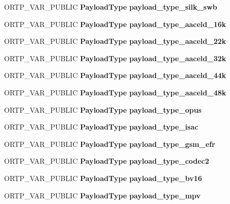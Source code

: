 \begin{DoxyCompactItemize}
O\+R\+T\+P\+\_\+\+V\+A\+R\+\_\+\+P\+U\+B\+L\+IC \textbf{ Payload\+Type} {\bfseries payload\+\_\+type\+\_\+silk\+\_\+swb}
\item 
\mbox{\label{payloadtype_8h_ac62ee0e65d25838cfeba9486b8907f7b}} 
O\+R\+T\+P\+\_\+\+V\+A\+R\+\_\+\+P\+U\+B\+L\+IC \textbf{ Payload\+Type} {\bfseries payload\+\_\+type\+\_\+aaceld\+\_\+16k}
\item 
\mbox{\label{payloadtype_8h_a86e4368c944cc1e7ff6abc2d0a742883}} 
O\+R\+T\+P\+\_\+\+V\+A\+R\+\_\+\+P\+U\+B\+L\+IC \textbf{ Payload\+Type} {\bfseries payload\+\_\+type\+\_\+aaceld\+\_\+22k}
\item 
\mbox{\label{payloadtype_8h_a3cdec7e99781dab60a2ab58a81e49925}} 
O\+R\+T\+P\+\_\+\+V\+A\+R\+\_\+\+P\+U\+B\+L\+IC \textbf{ Payload\+Type} {\bfseries payload\+\_\+type\+\_\+aaceld\+\_\+32k}
\item 
\mbox{\label{payloadtype_8h_af85fa455e0537670bf67feba5acfa2cb}} 
O\+R\+T\+P\+\_\+\+V\+A\+R\+\_\+\+P\+U\+B\+L\+IC \textbf{ Payload\+Type} {\bfseries payload\+\_\+type\+\_\+aaceld\+\_\+44k}
\item 
\mbox{\label{payloadtype_8h_a0b9a16464f1bd282c1ac50fd48a981bb}} 
O\+R\+T\+P\+\_\+\+V\+A\+R\+\_\+\+P\+U\+B\+L\+IC \textbf{ Payload\+Type} {\bfseries payload\+\_\+type\+\_\+aaceld\+\_\+48k}
\item 
\mbox{\label{payloadtype_8h_acedd965051514faf20d18bcac6273fa9}} 
O\+R\+T\+P\+\_\+\+V\+A\+R\+\_\+\+P\+U\+B\+L\+IC \textbf{ Payload\+Type} {\bfseries payload\+\_\+type\+\_\+opus}
\item 
\mbox{\label{payloadtype_8h_adc055078d81b67978fe095728c0d5eb6}} 
O\+R\+T\+P\+\_\+\+V\+A\+R\+\_\+\+P\+U\+B\+L\+IC \textbf{ Payload\+Type} {\bfseries payload\+\_\+type\+\_\+isac}
\item 
\mbox{\label{payloadtype_8h_a45271e49a019ada1de37e0219b1925c1}} 
O\+R\+T\+P\+\_\+\+V\+A\+R\+\_\+\+P\+U\+B\+L\+IC \textbf{ Payload\+Type} {\bfseries payload\+\_\+type\+\_\+gsm\+\_\+efr}
\item 
\mbox{\label{payloadtype_8h_a7deefb872468aac3860fa88377ac0798}} 
O\+R\+T\+P\+\_\+\+V\+A\+R\+\_\+\+P\+U\+B\+L\+IC \textbf{ Payload\+Type} {\bfseries payload\+\_\+type\+\_\+codec2}
\item 
\mbox{\label{payloadtype_8h_aeff6aff2cf170f114252e3a5498082b0}} 
O\+R\+T\+P\+\_\+\+V\+A\+R\+\_\+\+P\+U\+B\+L\+IC \textbf{ Payload\+Type} {\bfseries payload\+\_\+type\+\_\+bv16}
\item 
\mbox{\label{payloadtype_8h_acc09152fdfdecb7b8df1a760d7d87d7e}} 
O\+R\+T\+P\+\_\+\+V\+A\+R\+\_\+\+P\+U\+B\+L\+IC \textbf{ Payload\+Type} {\bfseries payload\+\_\+type\+\_\+mpv}

\end{DoxyCompactItemize}
